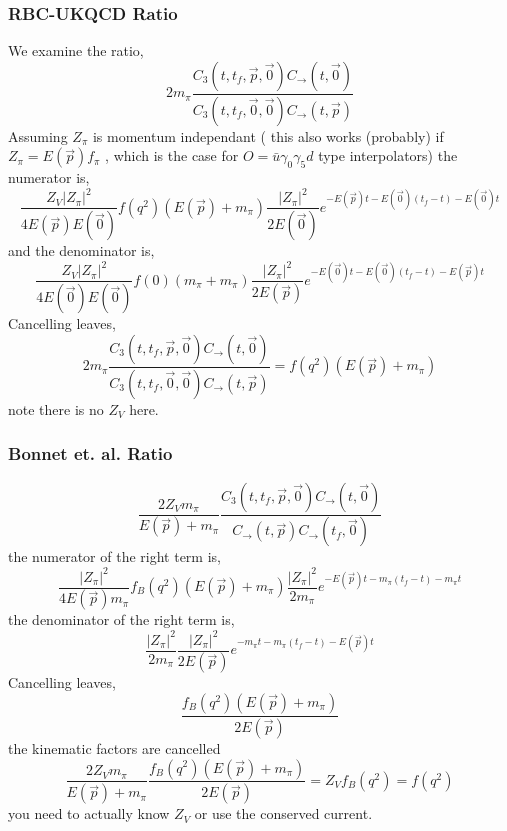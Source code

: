 \documentclass[3p,preprint]{elsarticle}
\begin{document}
\subsubsection{RBC-UKQCD Ratio}
We examine the ratio,
\begin{equation}
2 m_\pi \frac{ C_{3} (t, t_f, \vec{p}, \vec{0} )  C_{\rightarrow}(t, \vec{0}) }{ C_{3} (t, t_f, \vec{0}, \vec{0} )  C_{\rightarrow}(t, \vec{p}) }
\end{equation}
Assuming $Z_\pi$ is momentum independant ( this also works (probably) if $Z_\pi = E(\vec{p}) f_\pi$ , which is
the case for $O = \bar{u} \gamma_0 \gamma_5 d$ type interpolators) the numerator is,
\begin{equation}
\frac{ Z_V |Z_\pi|^2 }{ 4 E(\vec{p}) E(\vec{0})} f(q^2) ( E(\vec{p}) + m_\pi ) \frac{|Z_\pi|^2}{2 E(\vec{0})} e^{ -E(\vec{p})t - E(\vec{0})(t_f - t) -E(\vec{0})t }
\end{equation}
and the denominator is,
\begin{equation}
\frac{ Z_V |Z_\pi|^2 }{ 4 E(\vec{0}) E(\vec{0})} f(0) ( m_\pi + m_\pi ) \frac{|Z_\pi|^2}{2 E(\vec{p})} e^{ -E(\vec{0})t - E(\vec{0})(t_f - t) -E(\vec{p})t }
\end{equation}
Cancelling leaves,
\begin{equation}
2 m_\pi \frac{ C_{3} (t, t_f, \vec{p}, \vec{0} )  C_{\rightarrow}(t, \vec{0}) }{ C_{3} (t, t_f, \vec{0}, \vec{0} )  C_{\rightarrow}(t, \vec{p}) } = f(q^2) ( E(\vec{p}) + m_\pi )
\end{equation}
note there is no $Z_V$ here.

\subsubsection{Bonnet et. al. Ratio}

\begin{equation}
\frac{2 Z_V m_\pi}{E(\vec{p}) + m_\pi} \frac{ C_{3} (t, t_f, \vec{p}, \vec{0} )  C_{\rightarrow}(t, \vec{0}) }{ C_{\rightarrow} (t, \vec{p} )  C_{\rightarrow}(t_f, \vec{0}) }
\end{equation}
the numerator of the right term is,
\begin{equation}
\frac{ |Z_\pi|^2 }{ 4 E(\vec{p}) m_\pi} f_B(q^2) ( E(\vec{p}) + m_\pi ) \frac{|Z_\pi|^2}{2 m_\pi} e^{ -E(\vec{p})t - m_\pi(t_f - t) -m_\pi t }
\end{equation}
the denominator of the right term is,
\begin{equation}
\frac{ |Z_\pi|^2 }{ 2 m_\pi } \frac{|Z_\pi|^2}{2 E(\vec{p})} e^{ -m_\pi t - m_\pi (t_f - t) -E(\vec{p})t }
\end{equation}
Cancelling leaves,
\begin{equation}
\frac{ f_B(q^2) ( E(\vec{p}) + m_\pi ) }{ 2 E(\vec{p}) }
\end{equation}
the kinematic factors are cancelled
\begin{equation}
\frac{2 Z_V m_\pi}{E(\vec{p}) + m_\pi} \frac{ f_B(q^2) ( E(\vec{p}) + m_\pi ) }{ 2 E(\vec{p}) } = Z_V f_B(q^2) = f(q^2)
\end{equation}
you need to actually know $Z_V$ or use the conserved current.
\end{document}
